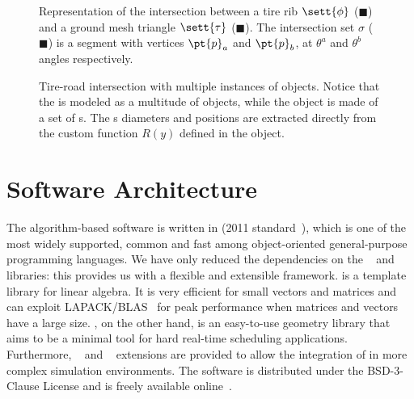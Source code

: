 \begin{figure}[htp]
  \centering
  \def\svgwidth{0.6\columnwidth}
  
  \caption{Representation of the intersection between a tire rib $\sett{\phi}$ (\textcolor[RGB]{255, 231, 187}{$\blacksquare$}) and a ground mesh triangle $\sett{\tau}$ (\textcolor[RGB]{255, 218, 217}{$\blacksquare$}). The intersection set $\sigma$ (\textcolor[RGB]{74, 181, 99}{$\blacksquare$}) is a segment with
  vertices $\pt{p}_a$ and $\pt{p}_b$, at $\theta^a$ and $\theta^b$ angles respectively.}
  \label{chap3:fig:intersection}
\end{figure}

\begin{figure}[htp]
  \centering
  \def\svgwidth{0.6\columnwidth}
  
  \caption{Tire-road intersection with multiple instances of \Shell{} objects. Notice that the \Mesh{} is modeled as a multitude of \TriangleGround{} objects, while the \Shell{} object is made of a set of \Rib{}s. The \Rib{}s diameters and positions are extracted directly from the custom function $R(y)$ defined in the \Shape{} object.}
  \label{chap3:fig:tire_zoom}
\end{figure}


\section{Software Architecture}
\label{chap3:SoftwareArchitecture}

The \Enve{} algorithm-based software is written in \cpp{} (2011 standard~\cite{stroustrup2013cpp}), which is one of the most widely supported, common and fast among object-oriented general-purpose programming languages. We have only reduced the dependencies on the \Eigen{}~\cite{eigen2010eigen} and \Acme{}~\cite{stocco2021acme} libraries: this provides us with a flexible and extensible framework. \Eigen{} is a template library for linear algebra. It is very efficient for small vectors and matrices and can exploit \ac{LAPACK}/\ac{BLAS}~\cite{anderson1999lapack} for peak performance when matrices and vectors have a large size. \Acme{}, on the other hand, is an easy-to-use geometry library that aims to be a minimal tool for hard real-time scheduling applications. Furthermore, \Matlab{}~\Mex{} and \Simulink{}~\SFunction{} extensions are provided to allow the integration of \Enve{} in more complex simulation environments. The software is distributed under the BSD-3-Clause License and is freely available online~\cite{enve}.


